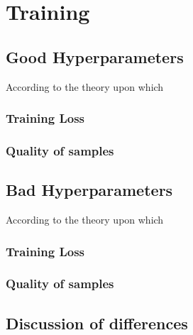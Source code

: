 \documentclass[11pt]{article}
\begin{document}
\section{Training}
\subsection{Good Hyperparameters}
According to the theory upon which 
\subsubsection{Training Loss}
\subsubsection{Quality of samples}
\subsection{Bad Hyperparameters}
According to the theory upon which 
\subsubsection{Training Loss}
\subsubsection{Quality of samples}
\subsection{Discussion of differences}
\end{document}
